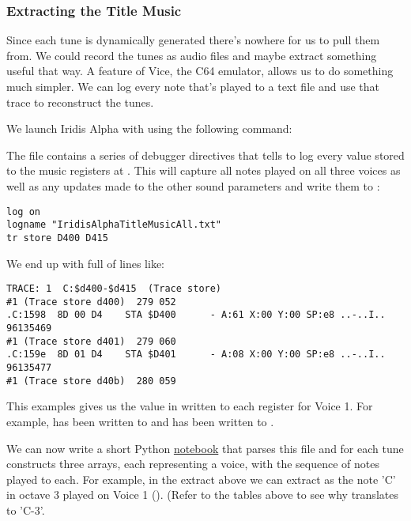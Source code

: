 \begin{tcolorbox}[%
  breakable,
  parbox = false,
  frame hidden,
  sharp corners,
  after skip=10pt,
  overlay broken = {
    \draw[]
      (frame.north west) rectangle (frame.south east);},
]{}
\subsubsection{Extracting the Title Music}

Since each tune is dynamically generated there's nowhere for us to pull them from. We could record
the tunes as audio files and maybe extract something useful that way. A feature of Vice, the C64
emulator, allows us to do something much simpler. We can log every note that's played to a 
text file and use that trace to reconstruct the tunes.

We launch Iridis Alpha with  using the following command:


The  file contains a series of debugger directives that tells 
to log every value stored to the music registers at . This will capture
all notes played on all three voices as well as any updates made to the other sound parameters
and write them to :

\begin{lstlisting}
log on
logname "IridisAlphaTitleMusicAll.txt"
tr store D400 D415
\end{lstlisting}

We end up with  full of lines like:

\begin{lstlisting}[basicstyle=\tiny]
TRACE: 1  C:$d400-$d415  (Trace store)
#1 (Trace store d400)  279 052
.C:1598  8D 00 D4    STA $D400      - A:61 X:00 Y:00 SP:e8 ..-..I..   96135469
#1 (Trace store d401)  279 060
.C:159e  8D 01 D4    STA $D401      - A:08 X:00 Y:00 SP:e8 ..-..I..   96135477
#1 (Trace store d40b)  280 059
\end{lstlisting}

This examples gives us the value in  written to each register for Voice 1. For example, 
has been written to  and  has been written to .

We can now write a short Python \href{https://github.com/mwenge/iatheory/tree/main/notebooks}{notebook} that
parses this file and for each tune constructs three arrays, each representing a voice, with the sequence
of notes played to each. For example, in the extract above we can extract  as the note 'C'
in octave 3 played on Voice 1 (). (Refer to the tables above to see why 
translates to 'C-3'.


\end{tcolorbox}
